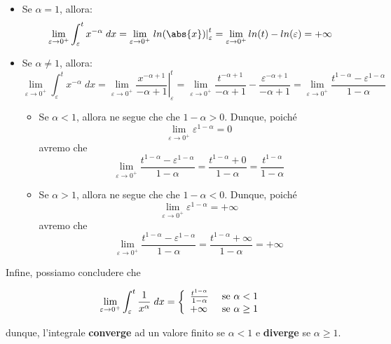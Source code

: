 \documentclass[a4paper, 12pt]{report}
\begin{document}
    \begin{itemize}
        \item Se $\alpha = 1$, allora:
        \[\lim_{\varepsilon \to 0^+} \int_{\varepsilon}^{t} x^{-\alpha} \; dx =
        \lim_{\varepsilon \to 0^+} \left . ln(\abs{x}) \right |_{\varepsilon}^{t} = \lim_{\varepsilon \to 0^+} ln(t) - ln(\varepsilon) = +\infty\]
        
        \item Se $\alpha \neq 1$, allora:
        \[\lim_{\varepsilon \to 0^+} \int_{\varepsilon}^{t} x^{-\alpha} \; dx =
        \lim_{\varepsilon \to 0^+} \left . \frac{x^{-\alpha+1}}{-\alpha+1} \right |_{\varepsilon}^{t} = \lim_{\varepsilon \to 0^+} \frac{t^{-\alpha+1}}{-\alpha+1} - \frac{\varepsilon^{-\alpha+1}}{-\alpha+1} = \lim_{\varepsilon \to 0^+} \frac{t^{1-\alpha}-\varepsilon^{1-\alpha}}{1-\alpha} \]
        
        \begin{itemize}
            \item Se $\alpha < 1$, allora ne segue che che $1-\alpha > 0$. Dunque, poiché
            \[ \lim_{\varepsilon \to 0^+} \varepsilon^{1-\alpha} = 0\]
            avremo che
            \[\lim_{\varepsilon \to 0^+} \frac{t^{1-\alpha}-\varepsilon^{1-\alpha}}{1-\alpha} = \frac{t^{1-\alpha}+0}{1-\alpha} = \frac{t^{1-\alpha}}{1-\alpha}\]
            
            \item Se $\alpha > 1$, allora ne segue che che $1-\alpha < 0$. Dunque, poiché
            \[ \lim_{\varepsilon \to 0^+} \varepsilon^{1-\alpha} = +\infty\]
            avremo che
            \[\lim_{\varepsilon \to 0^+} \frac{t^{1-\alpha}-\varepsilon^{1-\alpha}}{1-\alpha} = \frac{t^{1-\alpha}+\infty}{1-\alpha} = +\infty\]
        \end{itemize}
    \end{itemize}
    
    Infine, possiamo concludere che 
    
    $$
    \lim_{\varepsilon \to 0^+} \int_{\varepsilon}^{t} \frac{1}{x^{\alpha}} \; dx = \left \{ \begin{array}{l l}
            \frac{t^{1-\alpha}}{1-\alpha} & \text{ se } \alpha < 1 \\
            +\infty & \text{ se } \alpha \geq 1
    \end{array} \right .
    $$
    
    dunque, l'integrale \textbf{converge} ad un valore finito se $\alpha < 1$ e \textbf{diverge} se $\alpha \geq 1$.
    
\end{document}
